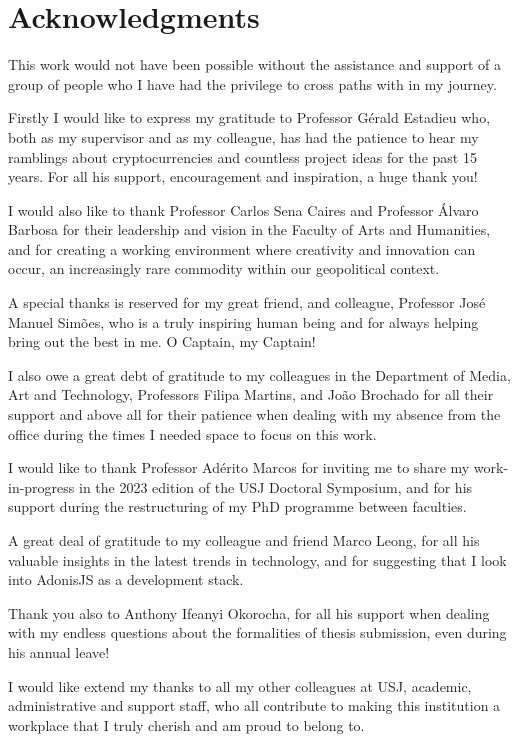 \chapter*{Acknowledgments}

This work would not have been possible without the assistance and support of a group of people who I have had the privilege to cross paths with in my journey.

Firstly I would like to express my gratitude to Professor Gérald Estadieu who, both as my supervisor and as my colleague, has had the patience to hear my ramblings about cryptocurrencies and countless project ideas for the past 15 years. For all his support, encouragement and inspiration, a huge thank you!

I would also like to thank Professor Carlos Sena Caires and Professor Álvaro Barbosa for their leadership and vision in the Faculty of Arts and Humanities, and for creating a working environment where creativity and innovation can occur, an increasingly rare commodity within our geopolitical context.

A special thanks is reserved for my great friend, and colleague, Professor José Manuel Simões, who is a truly inspiring human being and for always helping bring out the best in me. O Captain, my Captain!

I also owe a great debt of gratitude to my colleagues in the Department of Media, Art and Technology, Professors Filipa Martins, and João Brochado for all their support and above all for their patience when dealing with my absence from the office during the times I needed space to focus on this work.

I would like to thank Professor Adérito Marcos for inviting me to share my work-in-progress in the 2023 edition of the USJ Doctoral Symposium, and for his support during the restructuring of my PhD programme between faculties.

A great deal of gratitude to my colleague and friend Marco Leong, for all his valuable insights in the latest trends in technology, and for suggesting that I look into AdonisJS as a development stack.

Thank you also to Anthony Ifeanyi Okorocha, for all his support when dealing with my endless questions about the formalities of thesis submission, even during his annual leave!

I would like extend my thanks to all my other colleagues at USJ, academic, administrative and support staff, who all contribute to making this institution a workplace that I truly cherish and am proud to belong to. 

